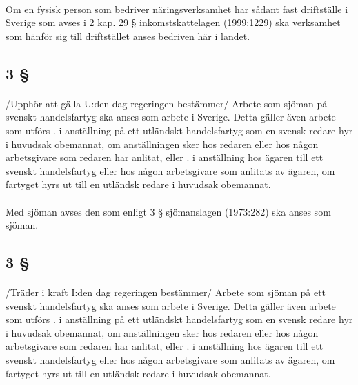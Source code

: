 \documentclass[a4paper,notitlepage,openany,10pt]{book}
\begin{document}
\paragraph*{}
Om en fysisk person som bedriver näringsverksamhet har sådant fast driftställe i Sverige som avses i 2 kap. 29 § inkomstskattelagen (1999:1229) ska verksamhet som hänför sig till driftstället anses bedriven här i landet.
\subsection*{3 §}
\paragraph*{}
/Upphör att gälla U:den dag regeringen bestämmer/
Arbete som sjöman på svenskt handelsfartyg ska anses som arbete i Sverige. Detta gäller även arbete som utförs
. i anställning på ett utländskt handelsfartyg som en svensk redare hyr i huvudsak obemannat, om anställningen sker hos redaren eller hos någon arbetsgivare som redaren har anlitat, eller
. i anställning hos ägaren till ett svenskt handelsfartyg eller hos någon arbetsgivare som anlitats av ägaren, om fartyget hyrs ut till en utländsk redare i huvudsak obemannat.
\paragraph*{}
Med sjöman avses den som enligt 3 § sjömanslagen (1973:282) ska anses som sjöman.
\subsection*{3 §}
\paragraph*{}
/Träder i kraft I:den dag regeringen bestämmer/
Arbete som sjöman på ett svenskt handelsfartyg ska anses som arbete i Sverige. Detta gäller även arbete som utförs
. i anställning på ett utländskt handelsfartyg som en svensk redare hyr i huvudsak obemannat, om anställningen sker hos redaren eller hos någon arbetsgivare som redaren har anlitat, eller
. i anställning hos ägaren till ett svenskt handelsfartyg eller hos någon arbetsgivare som anlitats av ägaren, om fartyget hyrs ut till en utländsk redare i huvudsak obemannat.
\end{document}
